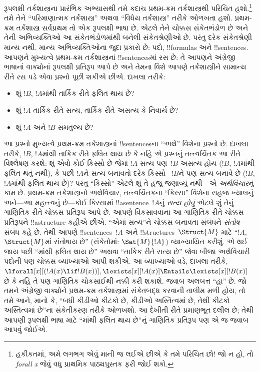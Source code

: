 \documentclass[../../../include/open-logic-section]{subfiles}
\begin{document}


રૂપલક્ષી તર્કશાસ્ત્રના પ્રારંભિક અભ્યાસથી તમે કદાચ પ્રથમ-ક્રમ
તર્કશાસ્ત્રથી પરિચિત હશો.\footnote{હકીકતમાં, અમે લગભગ એવું માની જ
લઈએ છીએ કે તમે પરિચિત છો!{} જો ન હો, તો \emph{forall x}
\citep{Magnus2021} જેવું વધુ પ્રાથમિક પાઠ્યપુસ્તક ફરી જોઈ શકો.} તમે તેને
``પરિમાણાત્મક તર્કશાસ્ત્ર'' અથવા ``વિધેય તર્કશાસ્ત્ર'' તરીકે ઓળખતા
હશો. પ્રથમ-ક્રમ તર્કશાસ્ત્ર સર્વપ્રથમ તો એક રૂપલક્ષી ભાષા છે. એટલે
તેને ચોક્કસ સંકેતભંડોળ છે અને તેની અભિવ્યક્તિઓ આ સંકેતભંડોળમાંથી બનેલી
સંકેતશ્રેણીઓ છે. પરંતુ દરેક સંકેતશ્રેણી માન્ય નથી. માન્ય અભિવ્યક્તિઓના જુદા
પ્રકારો છે: પદો, !!{formula}s અને !!{sentence}s. આપણને મુખ્યત્વે
પ્રથમ-ક્રમ તર્કશાસ્ત્રનાં !!{sentence}sમાં રસ છે: તે આપણને અંગ્રેજી
ભાષાનાં વાક્યોનાં રૂપલક્ષી પ્રતિરૂપ આપે છે અને તેમના વિશે આપણે
તર્કશાસ્ત્રીને સામાન્ય રીતે રસ પડે એવા પ્રશ્નો પૂછી શકીએ છીએ. દાખલા
તરીકે:
\begin{itemize}
    \item શું $!B$, $!A$માંથી તાર્કિક રીતે ફલિત થાય છે?
    \item શું $!A$ તાર્કિક રીતે સત્ય, તાર્કિક રીતે અસત્ય કે
નિવાર્ય છે?
    \item શું $!A$ અને $!B$ સમતુલ્ય છે?
\end{itemize}

આ પ્રશ્નો મુખ્યત્વે પ્રથમ-ક્રમ તર્કશાસ્ત્રનાં !!{sentence}sના
``અર્થ'' વિશેના પ્રશ્નો છે. દાખલા તરીકે, $!B$, $!A$માંથી તાર્કિક રીતે
ફલિત થાય છે કે નહિ એ પ્રશ્નનું તત્ત્વચિંતક આ રીતે વિશ્લેષણ કરશે: શું
એવો કોઈ કિસ્સો છે જેમાં $!A$ સત્ય પણ~$!B$ અસત્ય હોય ($!B$,
$!A$માંથી ફલિત થતું નથી), કે પછી $!A$ને સત્ય બનાવતો દરેક કિસ્સો
~$!B$ને પણ સત્ય બનાવે છે ($!B$, $!A$માંથી ફલિત થાય છે)? પરંતુ
``કિસ્સો'' એટલે શું તે હજુ જણાવ્યું નથી---એ \emph{અર્થવિચાર}નું કામ
છે. પ્રથમ-ક્રમ તર્કશાસ્ત્રનો અર્થવિચાર, તત્ત્વચિંતકના ``કિસ્સા'' વિશેના
સહજ ખ્યાલનું અને---આ મહત્ત્વનું છે---કોઈ કિસ્સામાં
!!a{sentence}~$!A$નું \emph{સત્ય હોવું} એટલે શું તેનું ગાણિતિક રીતે
ચોક્કસ પ્રતિરૂપ આપે છે. આપણે વિકસાવવાના આ ગાણિતિક રીતે ચોક્કસ
પ્રતિરૂપને !!a{structure} કહીએ છીએ. ``એમાં સત્ય''ને ચોક્કસ બનાવતા
સંબંધને \emph{સંતોષ}-સંબંધ કહે છે. તેથી આપણે !!{sentence}s~$!A$ અને
!!{structure}s~$\Struct{M}$ માટે ``$!A$,~$\Struct{M}$માં સંતોષાય છે''
(સંકેતોમાં: $\Sat{M}{!A}$) વ્યાખ્યાયિત કરીશું. એ થઈ જાય પછી ``માંથી
ફલિત થાય છે'' અથવા ``તાર્કિક રીતે સત્ય છે'' જેવા બીજા અર્થવિચારી
પદોની પણ ચોક્કસ વ્યાખ્યાઓ આપી શકીએ. આ વ્યાખ્યાઓ વડે, દાખલા તરીકે,
$\lforall[x][(!A(x) \lif !B(x))],
\lexists[x][!A(x)] \Entails \lexists[x][!B(x)]$ છે કે નહિ તે પણ
ગાણિતિક ચોકસાઈથી નક્કી કરી શકાશે. જવાબ અલબત્ત ``હા'' છે. જો તમને
અંગ્રેજી વાક્યોને પ્રથમ-ક્રમ તર્કશાસ્ત્રમાં સંકેતબદ્ધ કરવાની તાલીમ
મળી હોય, તો તમે આને, માનો કે, ``બધી કીડીઓ કીટકો છે, કીડીઓ અસ્તિત્વમાં
છે, તેથી કીટકો અસ્તિત્વમાં છે''ના સંકેતીકરણ તરીકે ઓળખશો. આ દેખીતી
રીતે પ્રમાણભૂત દલીલ છે; તેથી આપણી રૂપલક્ષી ભાષા માટે ``માંથી ફલિત થાય
છે''નું ગાણિતિક પ્રતિરૂપ પણ એ જ જવાબ આપવું જોઈએ.
\end{document}

